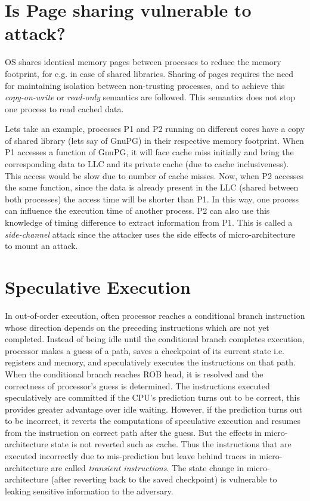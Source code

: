 \documentclass[a4paper,12pt, final]{report}
\begin{document}
\section{Is Page sharing vulnerable to attack?}
OS shares identical memory pages between processes to reduce the memory footprint, for e.g. in case of shared libraries. Sharing of pages requires the need for maintaining isolation between non-trusting processes, and to achieve this \textit{copy-on-write} or \textit{read-only} semantics are followed. This semantics does not stop one process to read cached data.

Lets take an example, processes P1 and P2 running on different cores have a copy of shared library (lets say of GnuPG) in their respective memory footprint. When P1 accesses a function of GnuPG, it will face cache miss initially and bring the corresponding data to LLC and its private cache (due to cache inclusiveness). This access would be slow due to number of cache misses. Now, when P2 accesses the same function, since the data is already present in the LLC (shared between both processes) the access time will be shorter than P1. In this way, one process can influence the execution time of another process. P2 can also use this knowledge of timing difference to extract information from P1. This is called a \textit{side-channel} attack since the attacker uses the side effects of micro-architecture to mount an attack.

\section{Speculative Execution}
In out-of-order execution, often processor reaches a conditional branch instruction whose direction depends on the preceding instructions which are not yet completed. Instead of being idle until the conditional branch completes execution, processor makes a guess of a path, saves a checkpoint of its current state i.e. registers and memory, and speculatively executes the instructions on that path. When the conditional branch reaches ROB head, it is resolved and the correctness of processor's guess is determined. The instructions executed speculatively are committed if the CPU's prediction turns out to be correct, this provides greater advantage over idle waiting. However, if the prediction turns out to be incorrect, it reverts the computations of speculative execution and resumes from the instruction on correct path after the guess. But the effects in micro-architecture state is not reverted such as cache. Thus the instructions that are executed incorrectly due to mis-prediction but leave behind traces in micro-architecture are called \textit{transient instructions}. The state change in micro-architecture (after reverting back to the saved checkpoint) is vulnerable to leaking sensitive information to the adversary.
\end{document}
